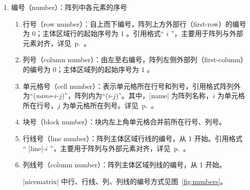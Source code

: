 \documentclass[dvipsnames]{article}%
\begin{document}
\begin{enumerate}

\item 编号（number）：阵列中各元素的序号
  \begin{enumerate}
  \item 行号（row number）：自上而下编号，阵列上方外部行（first-row）的编号为 $0$；主体区域行的起始序号为  $1$ 。引用格式“ $i$ ”，主要用于阵列与外部元素对齐，详见~p.~\pageref{zm:行线对齐}。
  \item 列号（column number）：由左至右编号，阵列左侧外部列（first-column）的编号为 $0$；主体区域列的起始序号为  $1$ 。
  \item 单元格号（cell number）：表示单元格所在行号和列号，引用格式阵列外为“(\textsl{name}-$i$-$j$)”，阵列内为“($i$-$j$)”。其中，|name| 为阵列名称，$i$ 为单元格所在行号，$j$ 为单元格所在列号。详见~p.~\pageref{zm:单元格编号}。
  \item 块号（block number）：块内左上角单元格合并前所在行号、列号。
  \item 行线号（line number）：阵列主体区域行线的编号，从 1 开始。引用格式 “ |line|-$i$ ”，主要用于阵列与外部元素对齐，详见~p.~\pageref{zm:行号对齐}。
  \item 列线号（column number）：阵列主体区域列线的编号，从 1 开始。
  
  |nicematrix| 中行、行线、列、列线的编号方式见图~\ref{fig:numbers}。
  
    \begin{figure}[H]
    

\end{figure}
\end{enumerate}
\end{enumerate}
\end{document}
